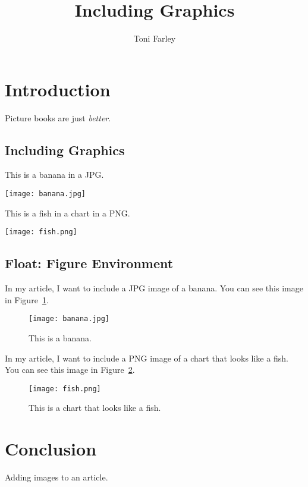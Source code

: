 \documentclass{proc}
\title{Including Graphics}
\author{Toni Farley}
\date{}
\begin{document}
\maketitle

\section{Introduction}

Picture books are just \emph{better}.

\subsection{Including Graphics}

This is a banana in a JPG.

\texttt{[image: banana.jpg]}

This is a fish in a chart in a PNG.

\texttt{[image: fish.png]}

\subsection{Float: Figure Environment}

In my article, I want to include a JPG image of a banana. You can see this image in Figure~\ref{fig:banana}.

\begin{figure}[htbp]
\begin{center}
\texttt{[image: banana.jpg]}
\caption{This is a banana.}
\label{fig:banana}
\end{center}
\end{figure}

In my article, I want to include a PNG image of a chart that looks like a fish. You can see this image in Figure~\ref{fig:fish}.

\begin{figure}[htbp]
\begin{center}
\texttt{[image: fish.png]}
\caption{This is a chart that looks like a fish.}
\label{fig:fish}
\end{center}
\end{figure}

\section{Conclusion}

Adding images to an article.
\end{document}
